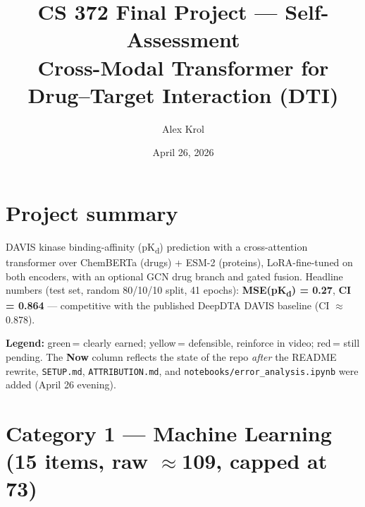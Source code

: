\documentclass[11pt]{article}
\title{CS 372 Final Project --- Self-Assessment\\\large Cross-Modal Transformer for Drug--Target Interaction (DTI)}
\author{Alex Krol}
\date{April 26, 2026}
\begin{document}
\maketitle

\section*{Project summary}
DAVIS kinase binding-affinity (pK\textsubscript{d}) prediction with a cross-attention
transformer over ChemBERTa (drugs) + ESM-2 (proteins), LoRA-fine-tuned on both encoders,
with an optional GCN drug branch and gated fusion. Headline numbers (test set, random
80/10/10 split, 41 epochs):
\textbf{MSE(pK\textsubscript{d}) = 0.27}, \textbf{CI = 0.864} --- competitive with the published
DeepDTA DAVIS baseline (CI $\approx$ 0.878).

\medskip
\noindent\textbf{Legend:}
\colorbox{rowgreen}{green}\,= clearly earned;\quad
\colorbox{rowyellow}{yellow}\,= defensible, reinforce in video;\quad
\colorbox{rowred}{red}\,= still pending.\quad
The \textbf{Now} column reflects the state of the repo \emph{after} the README rewrite,
\texttt{SETUP.md}, \texttt{ATTRIBUTION.md}, and \texttt{notebooks/error\_analysis.ipynb}
were added (April 26 evening).

\section*{Category 1 --- Machine Learning (15 items, raw $\approx$109, capped at 73)}
\end{document}
